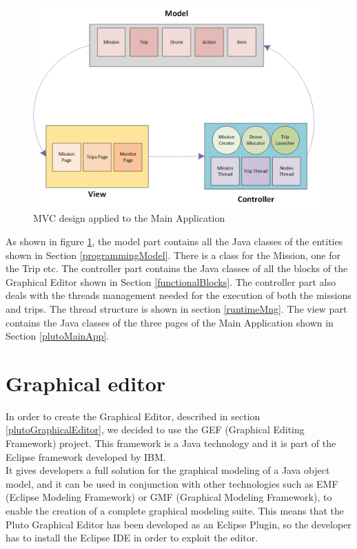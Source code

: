 \begin{figure}[h!]
\includegraphics[width=\linewidth]
{pictures/MVC.png}
\caption{MVC design applied to the Main Application}
\label{fig:mvc}
\end{figure}

As shown in figure \ref{fig:mvc}, the model part contains all the Java classes of the entities shown in Section \ref{programmingModel}.
There is a class for the Mission, one for the Trip etc.
The controller part contains the Java classes of all the blocks of the Graphical Editor shown in Section \ref{functionalBlocks}.
The controller part also deals with the threads management needed for the execution of both the missions and trips. The thread structure is shown in section \ref{runtimeMng}.
The view part contains the Java classes of the three pages of the Main Application shown in Section \ref{plutoMainApp}.
\\

\section{Graphical editor}\label{editor}

In order to create the Graphical Editor, described in section \ref{plutoGraphicalEditor}, we decided to use the GEF (Graphical Editing Framework) project. This framework is a Java technology and it is part of the Eclipse framework developed by IBM.
\\

It gives developers a full solution for the graphical modeling of a Java object model, and it can be used in conjunction with other technologies such as EMF (Eclipse Modeling Framework) or GMF (Graphical Modeling Framework), to enable the creation of a complete graphical modeling suite. 
This means that the Pluto Graphical Editor has been developed as an Eclipse Plugin, so the developer has to install the Eclipse IDE in order to exploit the editor.
\\

